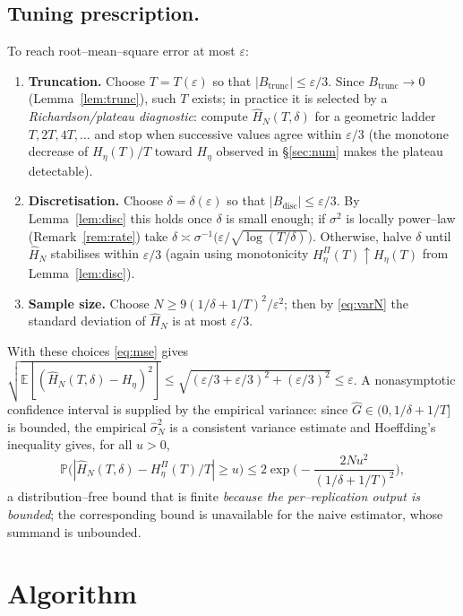 \documentclass{amsart}
\theoremstyle{definition}
\newcommand{\E}{\mathbb{E}}
\newcommand{\PP}{\mathbb{P}}
\begin{document}
\subsection{Tuning prescription.}
To reach root--mean--square error at most $\varepsilon$:
\begin{enumerate}
\item \textbf{Truncation.} Choose $T=T(\varepsilon)$ so that
  $|B_{\mathrm{trunc}}|\le\varepsilon/3$. Since $B_{\mathrm{trunc}}\to0$
  (Lemma~\ref{lem:trunc}), such $T$ exists; in practice it is selected by a
  \emph{Richardson/plateau diagnostic}: compute $\widehat H_N(T,\delta)$ for a
  geometric ladder $T,2T,4T,\dots$ and stop when successive values agree within
  $\varepsilon/3$ (the monotone decrease of $H_\eta(T)/T$ toward $H_\eta$ observed
  in \S\ref{sec:num} makes the plateau detectable).
\item \textbf{Discretisation.} Choose $\delta=\delta(\varepsilon)$ so that
  $|B_{\mathrm{disc}}|\le\varepsilon/3$. By Lemma~\ref{lem:disc} this holds once
  $\delta$ is small enough; if $\sigma^2$ is locally power--law
  (Remark~\ref{rem:rate}) take
  $\delta\asymp\sigma^{-1}\!\big(\varepsilon/\sqrt{\log(T/\delta)}\big)$.
  Otherwise, halve $\delta$ until $\widehat H_N$ stabilises within
  $\varepsilon/3$ (again using monotonicity $H_\eta^\Pi(T)\uparrow H_\eta(T)$ from
  Lemma~\ref{lem:disc}).
\item \textbf{Sample size.} Choose
  $N\ge 9(1/\delta+1/T)^2/\varepsilon^2$; then by \eqref{eq:varN} the standard
  deviation of $\widehat H_N$ is at most $\varepsilon/3$.
\end{enumerate}
With these choices \eqref{eq:mse} gives
$\sqrt{\E[(\widehat H_N(T,\delta)-H_\eta)^2]}\le
\sqrt{(\varepsilon/3+\varepsilon/3)^2+(\varepsilon/3)^2}\le\varepsilon$.
A nonasymptotic confidence interval is supplied by the empirical variance: since
$\widehat G\in(0,1/\delta+1/T]$ is bounded, the empirical $\widehat\sigma_N^2$ is a
consistent variance estimate and Hoeffding's inequality gives, for all $u>0$,
\begin{equation}\label{eq:hoeffding}
   \PP\big(|\widehat H_N(T,\delta)-H_\eta^\Pi(T)/T|\ge u\big)
   \le 2\exp\!\Big(-\frac{2Nu^2}{(1/\delta+1/T)^2}\Big),
\end{equation}
a distribution--free bound that is finite \emph{because the per--replication
output is bounded}; the corresponding bound is unavailable for the naive
estimator, whose summand is unbounded.

\section{Algorithm}
\end{document}
